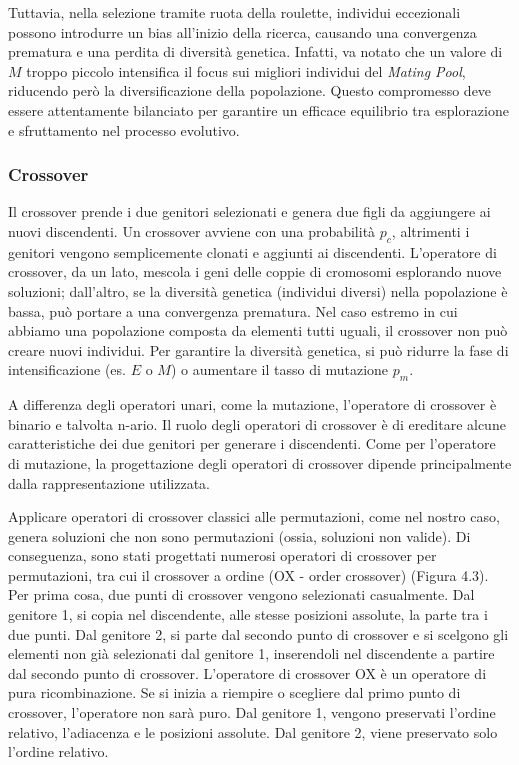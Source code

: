Tuttavia, nella selezione tramite ruota della roulette, individui eccezionali possono introdurre un bias all'inizio della ricerca, causando una convergenza prematura e una perdita di diversità genetica. Infatti, va notato che un valore di \( M \) troppo piccolo intensifica il focus sui migliori individui del \emph{Mating Pool}, riducendo però la diversificazione della popolazione. Questo compromesso deve essere attentamente bilanciato per garantire un efficace equilibrio tra esplorazione e sfruttamento nel processo evolutivo.

\subsubsection{Crossover}
Il crossover prende i due genitori selezionati e genera due figli da aggiungere ai nuovi discendenti. Un crossover avviene con una probabilità $p_c$, altrimenti i genitori vengono semplicemente clonati e aggiunti ai discendenti. L'operatore di crossover, da un lato, mescola i geni delle coppie di cromosomi esplorando nuove soluzioni; dall'altro, se la diversità genetica (individui diversi) nella popolazione è bassa, può portare a una convergenza prematura. Nel caso estremo in cui abbiamo una popolazione composta da elementi tutti uguali, il crossover non può creare nuovi individui. Per garantire la diversità genetica, si può ridurre la fase di intensificazione (es. $E$ o $M$) o aumentare il tasso di mutazione $p_m$.

A differenza degli operatori unari, come la mutazione, l'operatore di crossover è binario e talvolta n-ario. Il ruolo degli operatori di crossover è di ereditare alcune caratteristiche dei due genitori per generare i discendenti. Come per l'operatore di mutazione, la progettazione degli operatori di crossover dipende principalmente dalla rappresentazione utilizzata.

Applicare operatori di crossover classici alle permutazioni, come nel nostro caso, genera soluzioni che non sono permutazioni (ossia, soluzioni non valide). Di conseguenza, sono stati progettati numerosi operatori di crossover per permutazioni, tra cui il crossover a ordine (OX - order crossover) (Figura 4.3). Per prima cosa, due punti di crossover vengono selezionati casualmente. Dal genitore 1, si copia nel discendente, alle stesse posizioni assolute, la parte tra i due punti. Dal genitore 2, si parte dal secondo punto di crossover e si scelgono gli elementi non già selezionati dal genitore 1, inserendoli nel discendente a partire dal secondo punto di crossover. L'operatore di crossover OX è un operatore di pura ricombinazione. Se si inizia a riempire o scegliere dal primo punto di crossover, l'operatore non sarà puro. Dal genitore 1, vengono preservati l'ordine relativo, l'adiacenza e le posizioni assolute. Dal genitore 2, viene preservato solo l'ordine relativo. 


